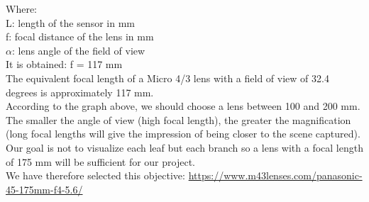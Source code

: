 \noindent Where:\\
L: length of the sensor in mm\\
f: focal distance of the lens in mm\\
\(\alpha\): lens angle of the field of view\\
It is obtained: f = 117 mm\\

The equivalent focal length of a Micro 4/3 lens with a field of view of 32.4 degrees is approximately 117 mm.\\


\noindent According to the graph above, we should choose a lens between 100 and 200 mm. The smaller the angle of view (high focal length), the greater the magnification (long focal lengths will give the impression of being closer to the scene captured).\\
Our goal is not to visualize each leaf but each branch so a lens with a focal length of 175 mm will be sufficient for our project.\\
We have therefore selected this objective: \url{https://www.m43lenses.com/panasonic-45-175mm-f4-5.6/}